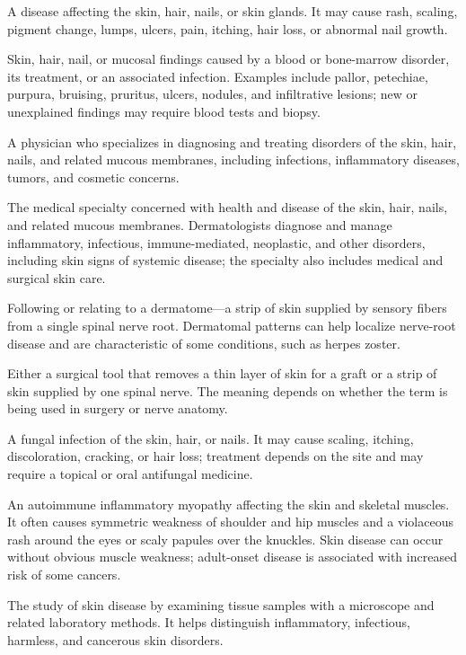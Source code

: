  A disease affecting the skin, hair, nails, or skin glands. It may cause rash, scaling, pigment change, lumps, ulcers, pain, itching, hair loss, or abnormal nail growth.

 Skin, hair, nail, or mucosal findings caused by a blood or bone-marrow disorder, its treatment, or an associated infection. Examples include pallor, petechiae, purpura, bruising, pruritus, ulcers, nodules, and infiltrative lesions; new or unexplained findings may require blood tests and biopsy.

 A physician who specializes in diagnosing and treating disorders of the skin, hair, nails, and related mucous membranes, including infections, inflammatory diseases, tumors, and cosmetic concerns.

 The medical specialty concerned with health and disease of the skin, hair, nails,
and related mucous membranes. Dermatologists diagnose and manage inflammatory, infectious,
immune-mediated, neoplastic, and other disorders, including skin signs of systemic disease;
the specialty also includes medical and surgical skin care.

 Following or relating to a dermatome—a strip of skin supplied by sensory fibers from a single spinal nerve root. Dermatomal patterns can help localize nerve-root disease and are characteristic of some conditions, such as herpes zoster.

 Either a surgical tool that removes a thin layer of skin for a graft or a strip of skin supplied by one spinal nerve. The meaning depends on whether the term is being used in surgery or nerve anatomy.

 A fungal infection of the skin, hair, or nails. It may cause scaling, itching, discoloration, cracking, or hair loss; treatment depends on the site and may require a topical or oral antifungal medicine.

 An autoimmune inflammatory myopathy affecting the skin and skeletal muscles. It
often causes symmetric weakness of shoulder and hip muscles and a violaceous rash around
the eyes or scaly papules over the knuckles. Skin disease can occur without obvious muscle
weakness; adult-onset disease is associated with increased risk of some cancers.

 The study of skin disease by examining tissue samples with a microscope and related laboratory methods. It helps distinguish inflammatory, infectious, harmless, and cancerous skin disorders.


